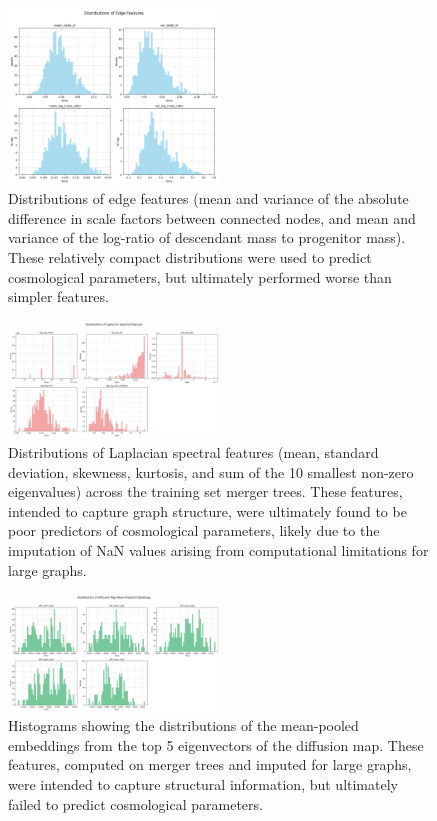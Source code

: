 \documentclass[twocolumn]{aastex631}
\begin{document}
\begin{figure}[h!]
    \centering
    \includegraphics[width=0.5\textwidth]{../input_files/plots/engineered_feature_dist_edge_1_20250527-135752.png}
    \caption{Distributions of edge features (mean and variance of the absolute difference in scale factors between connected nodes, and mean and variance of the log-ratio of descendant mass to progenitor mass). These relatively compact distributions were used to predict cosmological parameters, but ultimately performed worse than simpler features.}
    \label{fig:edge_feature_dist}
\end{figure}

\begin{figure}[h!]
    \centering
    \includegraphics[width=0.5\textwidth]{../input_files/plots/engineered_feature_dist_laplacian_2_20250527-135752.png}
    \caption{Distributions of Laplacian spectral features (mean, standard deviation, skewness, kurtosis, and sum of the 10 smallest non-zero eigenvalues) across the training set merger trees. These features, intended to capture graph structure, were ultimately found to be poor predictors of cosmological parameters, likely due to the imputation of NaN values arising from computational limitations for large graphs.}
    \label{fig:laplacian_feature_dist}
\end{figure}

\begin{figure}[h!]
    \centering
    \includegraphics[width=0.5\textwidth]{../input_files/plots/engineered_feature_dist_diff_mean_3_20250527-135752.png}
    \caption{Histograms showing the distributions of the mean-pooled embeddings from the top 5 eigenvectors of the diffusion map. These features, computed on merger trees and imputed for large graphs, were intended to capture structural information, but ultimately failed to predict cosmological parameters.}
    \label{fig:diffusion_feature_dist_mean}
\end{figure}
\end{document}
